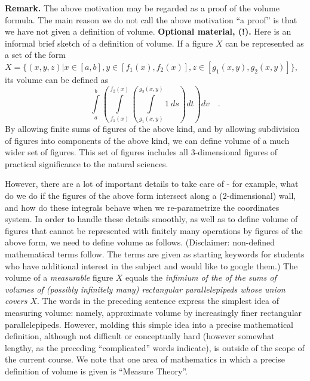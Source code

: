 \documentclass[12pt]{book}
\begin{document}
\begin{itemize}
\textbf{Remark.} The above motivation may be regarded as a proof of the volume formula. The main reason we do not call the above motivation ``a proof'' is that we have not given a definition of volume. \textbf{Optional material, (!).} Here is an informal brief sketch  of a definition of volume. If a figure $X$ can be represented as a set of the form $X= \{(x,y,z)| x\in [a,b], y\in [f_1(x), f_2(x)], z\in [g_1(x,y),  g_2(x,y)]\}$, its volume can be defined as 
\[
\int\limits_a^b \left(\int\limits_{f_1(x)}^{f_2(x)}\left(\int\limits_{g_1(x,y)}^{g_2(x,y)} 1 ~ ds \right)dt \right)dv \quad .
\]
By allowing finite sums of figures of the above kind, and by allowing subdivision of figures into components of the above kind, we can define volume of a much wider set of figures. This set of figures includes all 3-dimensional figures of practical significance to  the natural sciences. 

However, there are a lot of important details to take care of - for example, what do we do if the figures of the above form intersect along a (2-dimensional) wall, and how do these integrals behave when we re-parametrize the coordinates system. In order to handle these details smoothly, as well as to define volume of figures that cannot be represented with finitely many operations by  figures of the above form,  we need to define volume as follows. (Disclaimer: non-defined mathematical terms follow. The terms are given as starting keywords for students who have additional interest in the subject and would like to google them.) The volume of a \emph{measurable} figure $X$ equals the \emph{infimium of the of the sums of volumes of (possibly infinitely many) rectangular parallelepipeds whose union covers $X$}. The words in the preceding sentence express the simplest idea of measuring volume: namely, approximate volume by increasingly finer rectangular parallelepipeds. However, molding this simple idea into a precise mathematical definition, although not difficult or conceptually hard (however somewhat lengthy, as the preceding ``complicated'' words indicate), is outside of the scope of the current course. We note that one area of mathematics in which a precise definition of volume is given is ``Measure Theory''.
\end{itemize}
\end{document}
